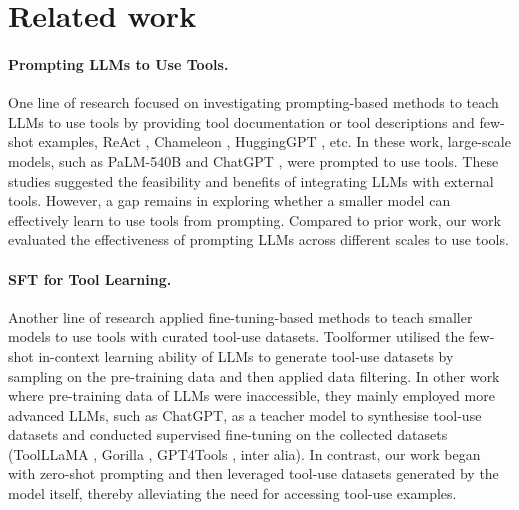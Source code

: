 \section{Related work}
\paragraph{Prompting LLMs to Use Tools.} 
One line of research focused on investigating prompting-based methods to teach LLMs to use tools by providing tool documentation \citep{DBLP:journals/corr/abs-2308-00675} or tool descriptions and few-shot examples, \eg ReAct \citep{DBLP:conf/iclr/YaoZYDSN023}, Chameleon \cite{DBLP:conf/nips/LuPCGCWZG23}, HuggingGPT \citep{DBLP:conf/nips/0001ST00Z23}, etc. In these work, large-scale models, such as PaLM-540B \citep{DBLP:journals/jmlr/ChowdheryNDBMRBCSGSSTMRBTSPRDHPBAI23} and ChatGPT \citep{DBLP:journals/corr/abs-2303-08774}, were prompted to use tools. These studies suggested the feasibility and benefits of integrating LLMs with external tools. However, a gap remains in exploring whether a smaller model can effectively learn to use tools from prompting. Compared to prior work, our work evaluated the effectiveness of prompting LLMs across different scales to use tools. 

\paragraph{SFT for Tool Learning.} 
Another line of research applied fine-tuning-based methods to teach smaller models to use tools with curated tool-use datasets. Toolformer \citep{DBLP:conf/nips/SchickDDRLHZCS23} utilised the few-shot in-context learning ability of LLMs to generate tool-use datasets by sampling on the pre-training data and then applied data filtering. In other work where pre-training data of LLMs were inaccessible, they mainly employed more advanced LLMs, such as ChatGPT, as a teacher model to synthesise tool-use datasets and conducted supervised fine-tuning on the collected datasets (\eg ToolLLaMA \citep{DBLP:conf/iclr/QinLYZYLLCTQZHT24}, Gorilla \citep{DBLP:journals/corr/abs-2305-15334}, GPT4Tools \cite{DBLP:conf/nips/YangSLZGLS23}, inter alia). In contrast, our work began with zero-shot prompting and then leveraged tool-use datasets generated by the model itself, thereby alleviating the need for accessing tool-use examples. 

